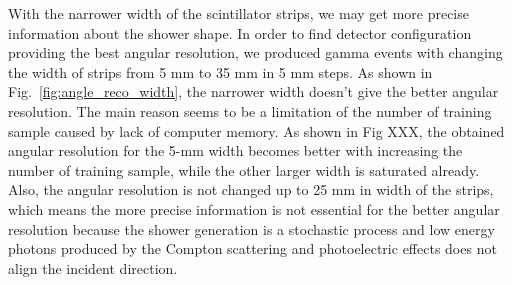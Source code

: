 \documentclass[jkps,preprint,fleqn,showpacs,showkeys]{revtex4}
\begin{document}
With the narrower width of the scintillator strips, we may get more precise information about the shower shape. In order to find detector configuration providing the best angular resolution, we produced gamma events with changing the width of strips from 5 mm to 35 mm in 5 mm steps. As shown in Fig.~\ref{fig:angle_reco_width}, the narrower width doesn't give the better angular resolution. The main reason seems to be a limitation of the number of training sample caused by lack of computer memory.  As shown in Fig XXX, the obtained angular resolution for the 5-mm width becomes better with increasing the number of training sample, while the other larger width is saturated already. %
Also, the angular resolution is not changed up to 25 mm in width of the strips, which means the more precise information is not essential for the better angular resolution because the shower generation is a stochastic process and low energy photons produced by the Compton scattering and photoelectric effects does not align the incident direction. 

\end{document}
